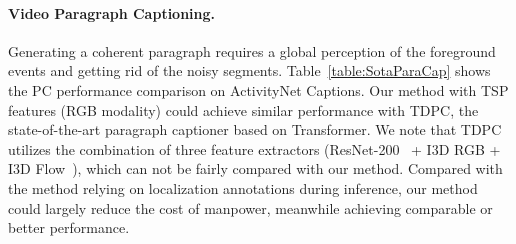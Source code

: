 \paragraph{\textbf{Video Paragraph Captioning.}} Generating a coherent paragraph requires a global perception of the foreground events and getting rid of the noisy segments. Table~\ref{table:SotaParaCap} shows the PC performance comparison on ActivityNet Captions.  Our method with  TSP features (RGB modality) could achieve similar performance with TDPC, the state-of-the-art paragraph captioner based on Transformer. We note that TDPC utilizes the combination of three feature extractors (ResNet-200~\cite{he2016deep} + I3D RGB + I3D Flow~\cite{carreira2017quo}), which can not be fairly compared with our method. Compared with the method relying on localization annotations during inference, our method could largely reduce the cost of manpower, meanwhile achieving comparable or better performance.

